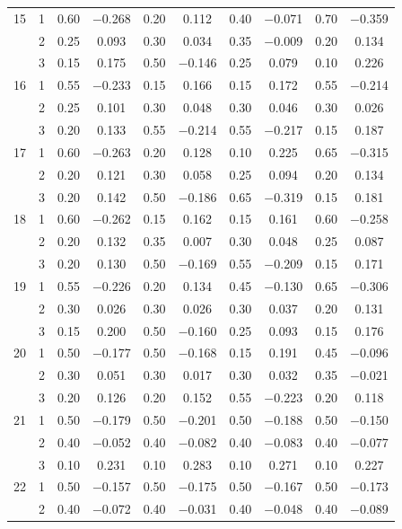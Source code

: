 \begin{longtable}{llcccccccc}
  15 & 1 & 0.60 & $-$0.268 & 0.20 & 0.112 & 0.40 & $-$0.071 & 0.70 & $-$0.359 \\ 
   & 2 & 0.25 & 0.093 & 0.30 & 0.034 & 0.35 & $-$0.009 & 0.20 & 0.134 \\ 
   & 3 & 0.15 & 0.175 & 0.50 & $-$0.146 & 0.25 & 0.079 & 0.10 & 0.226 \\ 
  16 & 1 & 0.55 & $-$0.233 & 0.15 & 0.166 & 0.15 & 0.172 & 0.55 & $-$0.214 \\ 
   & 2 & 0.25 & 0.101 & 0.30 & 0.048 & 0.30 & 0.046 & 0.30 & 0.026 \\ 
   & 3 & 0.20 & 0.133 & 0.55 & $-$0.214 & 0.55 & $-$0.217 & 0.15 & 0.187 \\ 
  17 & 1 & 0.60 & $-$0.263 & 0.20 & 0.128 & 0.10 & 0.225 & 0.65 & $-$0.315 \\ 
   & 2 & 0.20 & 0.121 & 0.30 & 0.058 & 0.25 & 0.094 & 0.20 & 0.134 \\ 
   & 3 & 0.20 & 0.142 & 0.50 & $-$0.186 & 0.65 & $-$0.319 & 0.15 & 0.181 \\ 
  18 & 1 & 0.60 & $-$0.262 & 0.15 & 0.162 & 0.15 & 0.161 & 0.60 & $-$0.258 \\ 
   & 2 & 0.20 & 0.132 & 0.35 & 0.007 & 0.30 & 0.048 & 0.25 & 0.087 \\ 
   & 3 & 0.20 & 0.130 & 0.50 & $-$0.169 & 0.55 & $-$0.209 & 0.15 & 0.171 \\ 
  19 & 1 & 0.55 & $-$0.226 & 0.20 & 0.134 & 0.45 & $-$0.130 & 0.65 & $-$0.306 \\ 
   & 2 & 0.30 & 0.026 & 0.30 & 0.026 & 0.30 & 0.037 & 0.20 & 0.131 \\ 
   & 3 & 0.15 & 0.200 & 0.50 & $-$0.160 & 0.25 & 0.093 & 0.15 & 0.176 \\ 
  20 & 1 & 0.50 & $-$0.177 & 0.50 & $-$0.168 & 0.15 & 0.191 & 0.45 & $-$0.096 \\ 
   & 2 & 0.30 & 0.051 & 0.30 & 0.017 & 0.30 & 0.032 & 0.35 & $-$0.021 \\ 
   & 3 & 0.20 & 0.126 & 0.20 & 0.152 & 0.55 & $-$0.223 & 0.20 & 0.118 \\ 
  21 & 1 & 0.50 & $-$0.179 & 0.50 & $-$0.201 & 0.50 & $-$0.188 & 0.50 & $-$0.150 \\ 
   & 2 & 0.40 & $-$0.052 & 0.40 & $-$0.082 & 0.40 & $-$0.083 & 0.40 & $-$0.077 \\ 
   & 3 & 0.10 & 0.231 & 0.10 & 0.283 & 0.10 & 0.271 & 0.10 & 0.227 \\ 
  22 & 1 & 0.50 & $-$0.157 & 0.50 & $-$0.175 & 0.50 & $-$0.167 & 0.50 & $-$0.173 \\ 
   & 2 & 0.40 & $-$0.072 & 0.40 & $-$0.031 & 0.40 & $-$0.048 & 0.40 & $-$0.089 \\ 

\end{longtable}
